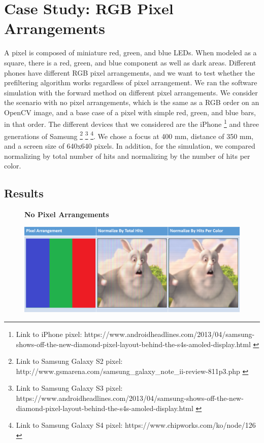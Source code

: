 \chapter{Case Study: RGB Pixel Arrangements}

A pixel is composed of miniature red, green, and blue LEDs. When modeled as a square, there is a red, green, and blue component as well as dark areas. Different phones have different RGB pixel arrangements, and we want to test whether the prefiltering algorithm works regardless of pixel arrangement. We ran the software simulation with the forward method on different pixel arrangements. We consider the scenario with no pixel arrangements, which is the same as a RGB order on an OpenCV image, and a base case of a pixel with simple red, green, and blue bars, in that order. The different devices that we considered are the iPhone \footnote{Link to iPhone pixel: https://www.androidheadlines.com/2013/04/samsung-shows-off-the-new-diamond-pixel-layout-behind-the-s4s-amoled-display.html \cite{android:headlines}} and three generations of Samsung \footnote{Link to Samsung Galaxy S2 pixel: http://www.gsmarena.com/samsung\_galaxy\_note\_ii-review-811p3.php \cite{gsmarena}} \footnote{Link to Samsung Galaxy S3 pixel: https://www.androidheadlines.com/2013/04/samsung-shows-off-the-new-diamond-pixel-layout-behind-the-s4s-amoled-display.html \cite{android:headlines}}  \footnote{Link to Samsung Galaxy S4 pixel: https://www.chipworks.com/ko/node/126 \cite{chipworks}}. We chose a focus at 400 mm, distance of 350 mm, and a screen size of 640x640 pixels. In addition, for the simulation, we compared normalizing by total number of hits and normalizing by the number of hits per color.

\section{Results}


\begin{figure}
    \centering
    \textbf{No Pixel Arrangements}\par\medskip
    \includegraphics[width=6in]{chapters/chapter7/images/No_Pixel_Arrangement.png}
\end{figure}

